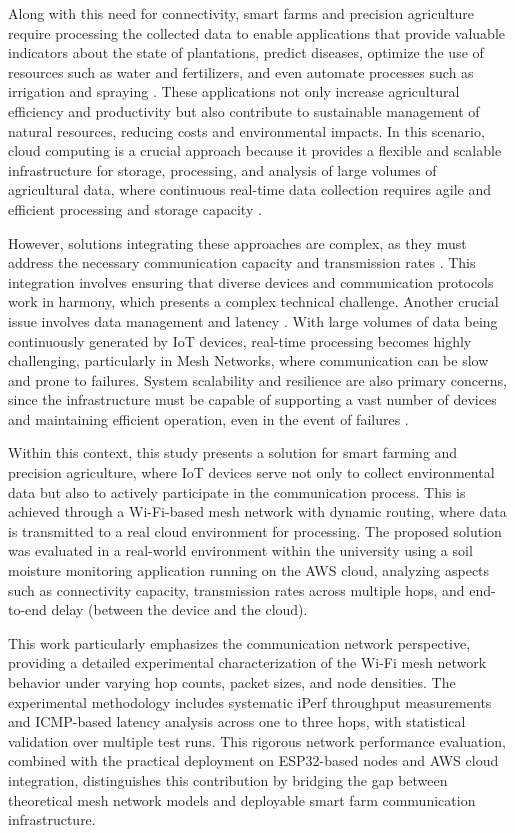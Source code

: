 \documentclass[journal]{IEEEtran}
\begin{document}
Along with this need for connectivity, smart farms and precision agriculture require processing the collected data to enable applications that provide valuable indicators about the state of plantations, predict diseases, optimize the use of resources such as water and fertilizers, and even automate processes such as irrigation and spraying \cite{karunathilake2023path}. These applications not only increase agricultural efficiency and productivity but also contribute to sustainable management of natural resources, reducing costs and environmental impacts. In this scenario, cloud computing is a crucial approach because it provides a flexible and scalable infrastructure for storage, processing, and analysis of large volumes of agricultural data, where continuous real-time data collection requires agile and efficient processing and storage capacity \cite{turukmane2023smart}.

However, solutions integrating these approaches are complex, as they must address the necessary communication capacity and transmission rates \cite{10154280,portela-noms}. This integration involves ensuring that diverse devices and communication protocols work in harmony, which presents a complex technical challenge. Another crucial issue involves data management and latency \cite{costa2021features}. With large volumes of data being continuously generated by IoT devices, real-time processing becomes highly challenging, particularly in Mesh Networks, where communication can be slow and prone to failures. System scalability and resilience are also primary concerns, since the infrastructure must be capable of supporting a vast number of devices and maintaining efficient operation, even in the event of failures \cite{Brito-LNet-2026}.

Within this context, this study presents a solution for smart farming and precision agriculture, where IoT devices serve not only to collect environmental data but also to actively participate in the communication process. This is achieved through a Wi-Fi-based mesh network with dynamic routing, where data is transmitted to a real cloud environment for processing. The proposed solution was evaluated in a real-world environment within the university using a soil moisture monitoring application running on the AWS cloud, analyzing aspects such as connectivity capacity, transmission rates across multiple hops, and end-to-end delay (between the device and the cloud).

This work particularly emphasizes the communication network perspective, providing a detailed experimental characterization of the Wi-Fi mesh network behavior under varying hop counts, packet sizes, and node densities. The experimental methodology includes systematic iPerf throughput measurements and ICMP-based latency analysis across one to three hops, with statistical validation over multiple test runs. This rigorous network performance evaluation, combined with the practical deployment on ESP32-based nodes and AWS cloud integration, distinguishes this contribution by bridging the gap between theoretical mesh network models and deployable smart farm communication infrastructure.
\end{document}
